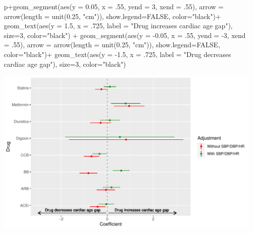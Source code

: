 \documentclass[
]{article}
\newenvironment{Shaded}{\begin{snugshade}}{\end{snugshade}}
\newcommand{\AttributeTok}[1]{\textcolor[rgb]{0.77,0.63,0.00}{#1}}
\newcommand{\ConstantTok}[1]{\textcolor[rgb]{0.00,0.00,0.00}{#1}}
\newcommand{\DecValTok}[1]{\textcolor[rgb]{0.00,0.00,0.81}{#1}}
\newcommand{\FloatTok}[1]{\textcolor[rgb]{0.00,0.00,0.81}{#1}}
\newcommand{\FunctionTok}[1]{\textcolor[rgb]{0.00,0.00,0.00}{#1}}
\newcommand{\NormalTok}[1]{#1}
\newcommand{\SpecialCharTok}[1]{\textcolor[rgb]{0.00,0.00,0.00}{#1}}
\newcommand{\StringTok}[1]{\textcolor[rgb]{0.31,0.60,0.02}{#1}}
\begin{document}
\begin{Shaded}
\begin{Highlighting}[]
\NormalTok{p}\SpecialCharTok{+}\FunctionTok{geom\_segment}\NormalTok{(}\FunctionTok{aes}\NormalTok{(}\AttributeTok{y =} \FloatTok{0.05}\NormalTok{, }\AttributeTok{x =}\NormalTok{ .}\DecValTok{55}\NormalTok{, }\AttributeTok{yend =} \DecValTok{3}\NormalTok{, }\AttributeTok{xend =}\NormalTok{ .}\DecValTok{55}\NormalTok{),}
                  \AttributeTok{arrow =} \FunctionTok{arrow}\NormalTok{(}\AttributeTok{length =} \FunctionTok{unit}\NormalTok{(}\FloatTok{0.25}\NormalTok{, }\StringTok{"cm"}\NormalTok{)), }\AttributeTok{show.legend=}\ConstantTok{FALSE}\NormalTok{, }\AttributeTok{color=}\StringTok{"black"}\NormalTok{)}\SpecialCharTok{+}
    \FunctionTok{geom\_text}\NormalTok{(}\FunctionTok{aes}\NormalTok{(}\AttributeTok{y =} \FloatTok{1.5}\NormalTok{, }\AttributeTok{x =}\NormalTok{ .}\DecValTok{725}\NormalTok{, }\AttributeTok{label =} \StringTok{"Drug increases cardiac age gap"}\NormalTok{), }\AttributeTok{size=}\DecValTok{3}\NormalTok{, }\AttributeTok{color=}\StringTok{"black"}\NormalTok{) }\SpecialCharTok{+}
\FunctionTok{geom\_segment}\NormalTok{(}\FunctionTok{aes}\NormalTok{(}\AttributeTok{y =} \SpecialCharTok{{-}}\FloatTok{0.05}\NormalTok{, }\AttributeTok{x =}\NormalTok{ .}\DecValTok{55}\NormalTok{, }\AttributeTok{yend =} \SpecialCharTok{{-}}\DecValTok{3}\NormalTok{, }\AttributeTok{xend =}\NormalTok{ .}\DecValTok{55}\NormalTok{),}
                  \AttributeTok{arrow =} \FunctionTok{arrow}\NormalTok{(}\AttributeTok{length =} \FunctionTok{unit}\NormalTok{(}\FloatTok{0.25}\NormalTok{, }\StringTok{"cm"}\NormalTok{)), }\AttributeTok{show.legend=}\ConstantTok{FALSE}\NormalTok{, }\AttributeTok{color=}\StringTok{"black"}\NormalTok{)}\SpecialCharTok{+}
    \FunctionTok{geom\_text}\NormalTok{(}\FunctionTok{aes}\NormalTok{(}\AttributeTok{y =} \SpecialCharTok{{-}}\FloatTok{1.5}\NormalTok{, }\AttributeTok{x =}\NormalTok{ .}\DecValTok{725}\NormalTok{, }\AttributeTok{label =} \StringTok{"Drug decreases cardiac age gap"}\NormalTok{), }\AttributeTok{size=}\DecValTok{3}\NormalTok{, }\AttributeTok{color=}\StringTok{"black"}\NormalTok{)}
\end{Highlighting}
\end{Shaded}

\includegraphics{../results/report_files/figure-latex/med-effect-forest-2-with-arrows-1.pdf}
\end{document}
